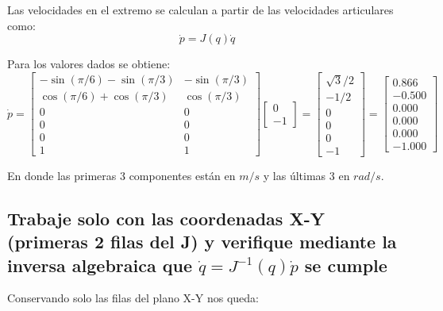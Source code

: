 \documentclass[a4paper,12pt]{article}
\begin{document}
Las velocidades en el extremo se calculan a partir de las velocidades articulares como:
\begin{equation}
    \dot{p} = J(q)\dot{q}
\end{equation}

Para los valores dados se obtiene:
\begin{equation*}
    \dot{p} = 
    \begin{bmatrix}
        -\sin(\pi/6) - \sin(\pi/3) & -\sin(\pi/3)\\
        \cos(\pi/6) + \cos(\pi/3)  & \cos(\pi/3)\\
        0                          & 0\\
        0                          & 0\\
        0                          & 0\\
        1                          & 1
    \end{bmatrix}
    \begin{bmatrix}
        0\\
        -1
    \end{bmatrix}
    =
    \begin{bmatrix}
        \sqrt{3}/2\\
        -1/2\\
        0\\
        0\\
        0\\
        -1
    \end{bmatrix}
    =
    \begin{bmatrix}
        0.866\\
        -0.500\\
        0.000\\
        0.000\\
        0.000\\
        -1.000
    \end{bmatrix}
\end{equation*}

En donde las primeras 3 componentes están en $m/s$ y las últimas 3 en $rad/s$.

\subsection{Trabaje solo con las coordenadas X-Y (primeras 2 filas del J) y verifique mediante la
inversa algebraica que $\dot{q} = J^{-1}(q)\dot{p}$ se cumple}

Conservando solo las filas del plano X-Y nos queda:
\end{document}
